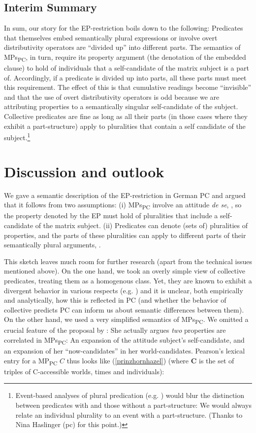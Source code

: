 \documentclass[output=paper,colorlinks,citecolor=brown,
]{langscibook}
\begin{document}
\subsection{Interim Summary}

In sum, our story for the EP-restriction boils down to the following: Predicates that themselves embed semantically plural expressions or involve overt distributivity operators are “divided up” into different parts. The semantics of MPs\textsubscript{PC}, in turn, require its property argument (the denotation of the embedded clause) to hold of individuals that a self-candidate of the matrix subject is a part of. Accordingly, if a predicate is divided up into parts, all these parts must meet this requirement. The effect of this is that cumulative readings become “invisible” and that the use of overt distributivity operators is odd because we are attributing properties to a semantically singular self-candidate of the subject. Collective predicates are fine as long as all their parts (in those cases where they exhibit a part-structure) apply to pluralities that contain a self candidate of the subject.\footnote{Event-based analyses of plural predication (e.g. \citealt{Kratzer:2000}) would blur the distinction between predicates with and those without a part-structure: We would always relate an individual plurality to an event with a part-structure. (Thanks to Nina Haslinger (pc) for this point.)}

\section{Discussion and outlook}\label{prinzhornsec:5}

We gave a semantic description of the EP-restriction in German PC and argued that it follows from two assumptions: (i) MPs\textsubscript{PC} involve an attitude \textit{de se}, \citep{Pearson:2016}, so the property denoted by the EP must hold of pluralities that include a self-candidate of the matrix subject. (ii) Predicates can denote (sets of) pluralities of properties, and the parts of these pluralities can apply to different parts of their semantically plural arguments, \citep{Haslinger:2018a,Haslinger:2018b}.

This sketch leaves much room for further research (apart from the technical issues mentioned above). On the one hand, we took an overly simple view of collective predicates, treating them as a homogenous class. Yet, they are known to exhibit a divergent behavior in various respects (e.g. \citealt{Dowty:1986, Landman:2000}) and it is unclear, both empirically and analytically, how this is reflected in PC (and whether the behavior of collective predicts PC can inform us about  semantic differences between them).
On the other hand,  we used a very simplified semantics of MPs\textsubscript{PC}. We omitted a crucial feature of the proposal by \citet{Pearson:2016}: She actually 
 argues \textit{two} properties are correlated in  MPs\textsubscript{PC}: An expansion of the attitude subject's self-candidate, and an expansion of her “now-candidates” in her world-candidates. Pearson's lexical entry for a MP\textsubscript{PC} $C$ thus looks like (\ref{prinzhornhazel}) (where \textbf{C} is the set of triples of C-accessible worlds, times and individuals):
\end{document}
